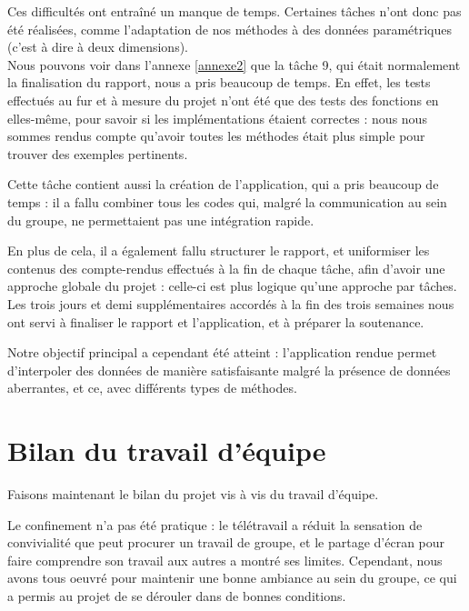 \documentclass[a4paper,12pt]{article} %
\begin{document}
    Ces difficultés ont entraîné un manque de temps. Certaines tâches n'ont donc pas été réalisées, comme l'adaptation de nos méthodes à des données paramétriques (c'est à dire à deux dimensions).\\
    
    Nous pouvons voir dans l'annexe \ref{annexe2} que la tâche 9, qui était normalement la finalisation du rapport, nous a pris beaucoup de temps. En effet, les tests effectués au fur et à mesure du projet n'ont été que des tests des fonctions en elles-même, pour savoir si les implémentations étaient correctes : nous nous sommes rendus compte qu'avoir toutes les méthodes était plus simple pour trouver des exemples pertinents.
    
    Cette tâche contient aussi la création de l'application, qui a pris beaucoup de temps : il a fallu combiner tous les codes qui, malgré la communication au sein du groupe, ne permettaient pas une intégration rapide.
    
    En plus de cela, il a également fallu structurer le rapport, et uniformiser les contenus des compte-rendus effectués à la fin de chaque tâche, afin d'avoir une approche globale du projet : celle-ci est plus logique qu'une approche par tâches.\\
    
    Les trois jours et demi supplémentaires accordés à la fin des trois semaines nous ont servi à finaliser le rapport et l'application, et à préparer la soutenance.
    
    Notre objectif principal a cependant été atteint : l'application rendue permet d'interpoler des données de manière satisfaisante malgré la présence de données aberrantes, et ce, avec différents types de méthodes.
    
	\section{Bilan du travail d'équipe}
	Faisons maintenant le bilan du projet vis à vis du travail d'équipe.
	
	Le confinement n'a pas été pratique : le télétravail a réduit la sensation de convivialité que peut procurer un travail de groupe, et le partage d'écran pour faire comprendre son travail aux autres a montré ses limites. Cependant, nous avons tous oeuvré pour maintenir une bonne ambiance au sein du groupe, ce qui a permis au projet de se dérouler dans de bonnes conditions.
	
\end{document}
